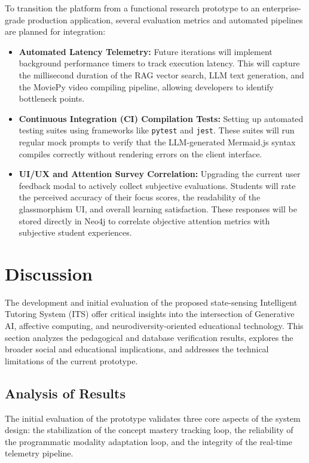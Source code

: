 \documentclass[final,5p,times,twocolumn,authoryear]{elsarticle}
\begin{document}
To transition the platform from a functional research prototype to an enterprise-grade production application, several evaluation metrics and automated pipelines are planned for integration:
\begin{itemize}
    \item \textbf{Automated Latency Telemetry:} Future iterations will implement background performance timers to track execution latency. This will capture the millisecond duration of the RAG vector search, LLM text generation, and the MoviePy video compiling pipeline, allowing developers to identify bottleneck points.
    \item \textbf{Continuous Integration (CI) Compilation Tests:} Setting up automated testing suites using frameworks like \texttt{pytest} and \texttt{jest}. These suites will run regular mock prompts to verify that the LLM-generated Mermaid.js syntax compiles correctly without rendering errors on the client interface.
    \item \textbf{UI/UX and Attention Survey Correlation:} Upgrading the current user feedback modal to actively collect subjective evaluations. Students will rate the perceived accuracy of their focus scores, the readability of the glassmorphism UI, and overall learning satisfaction. These responses will be stored directly in Neo4j to correlate objective attention metrics with subjective student experiences.
\end{itemize}

\section{Discussion}
\label{sec:discussion}

The development and initial evaluation of the proposed state-sensing Intelligent Tutoring System (ITS) offer critical insights into the intersection of Generative AI, affective computing, and neurodiversity-oriented educational technology. This section analyzes the pedagogical and database verification results, explores the broader social and educational implications, and addresses the technical limitations of the current prototype.

\subsection{Analysis of Results}
\label{subsec:analysis_results}

The initial evaluation of the prototype validates three core aspects of the system design: the stabilization of the concept mastery tracking loop, the reliability of the programmatic modality adaptation loop, and the integrity of the real-time telemetry pipeline.
\end{document}
